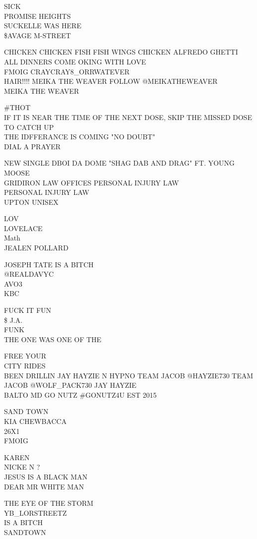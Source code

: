 \documentclass[10pt,letterpaper]{article}
\begin{document}
SICK\\
PROMISE HEIGHTS\\
SUCKELLE WAS HERE\\
\$AVAGE M{-}STREET

CHICKEN CHICKEN FISH FISH WINGS CHICKEN ALFREDO GHETTI ALL DINNERS COME OKING WITH LOVE\\
FMOIG CRAYCRAY8\_ORRWATEVER\\
HAIR!!!! MEIKA THE WEAVER FOLLOW @MEIKATHEWEAVER\\
MEIKA THE WEAVER

\#THOT\\
IF IT IS NEAR THE TIME OF THE NEXT DOSE, SKIP THE MISSED DOSE TO CATCH UP\\
THE IDFFERANCE IS COMING "NO DOUBT"\\
DIAL A PRAYER

NEW SINGLE DBOI DA DOME "SHAG DAB AND DRAG" FT. YOUNG MOOSE\\
GRIDIRON LAW OFFICES PERSONAL INJURY LAW\\
PERSONAL INJURY LAW\\
UPTON UNISEX

LOV\\
LOVELACE\\
Math\\
JEALEN POLLARD

JOSEPH TATE IS A BITCH\\
@REALDAVYC\\
AVO3\\
KBC

FUCK IT FUN\\
\$ J.A.\\
FUNK\\
THE ONE WAS ONE OF THE

FREE YOUR\\
CITY RIDES\\
BEEN DRILLIN JAY HAYZIE N HYPNO TEAM JACOB @HAYZIE730 TEAM JACOB @WOLF\_PACK730 JAY HAYZIE\\
BALTO MD GO NUTZ \#GONUTZ4U EST 2015

SAND TOWN\\
KIA CHEWBACCA\\
26X1\\
FMOIG

KAREN\\
NICKE N ?\\
JESUS IS A BLACK MAN\\
DEAR MR WHITE MAN

THE EYE OF THE STORM\\
YB\_LORSTREETZ\\
IS A BITCH\\
SANDTOWN
\end{document}
